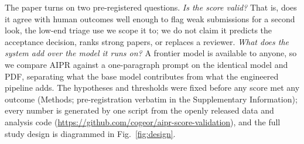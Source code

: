 The paper turns on two pre-registered questions. \emph{Is the score valid?} That is, does it
agree with human outcomes well enough to flag weak submissions for a second look, the low-end
triage use we scope it to; we do not claim it predicts the acceptance decision, ranks strong
papers, or replaces a reviewer. \emph{What does the system add over the model it runs on?} A
frontier model is available to anyone, so we compare AIPR against a one-paragraph prompt on
the identical model and PDF, separating what the base model contributes from what the
engineered pipeline adds. The hypotheses and thresholds were fixed before any score met any
outcome (Methods; pre-registration verbatim in the Supplementary Information); every number
is generated by one script from the openly released data and analysis code
(\url{https://github.com/cogeor/aipr-score-validation}), and the full study design is
diagrammed in Fig.~\ref{fig:design}.
